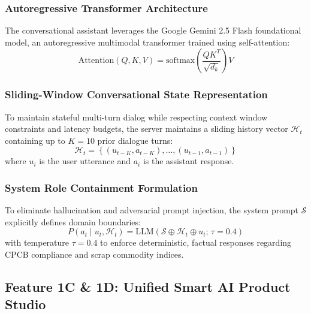 \documentclass[12pt,a4paper]{article}
\begin{document}
\subsubsection{Autoregressive Transformer Architecture}
The conversational assistant leverages the Google Gemini 2.5 Flash foundational model, an autoregressive multimodal transformer trained using self-attention:
\begin{equation}
\text{Attention}(Q, K, V) = \text{softmax}\left(\frac{QK^T}{\sqrt{d_k}}\right)V
\end{equation}

\subsubsection{Sliding-Window Conversational State Representation}
To maintain stateful multi-turn dialog while respecting context window constraints and latency budgets, the server maintains a sliding history vector $\mathcal{H}_t$ containing up to $K = 10$ prior dialogue turns:
\begin{equation}
\mathcal{H}_t = \left\{ (u_{t-K}, a_{t-K}), \dots, (u_{t-1}, a_{t-1}) \right\}
\end{equation}
where $u_i$ is the user utterance and $a_i$ is the assistant response.

\subsubsection{System Role Containment Formulation}
To eliminate hallucination and adversarial prompt injection, the system prompt $\mathcal{S}$ explicitly defines domain boundaries:
\begin{equation}
P(a_t \mid u_t, \mathcal{H}_t) = \text{LLM}\left(\mathcal{S} \oplus \mathcal{H}_t \oplus u_t; \, \tau = 0.4\right)
\end{equation}
with temperature $\tau = 0.4$ to enforce deterministic, factual responses regarding CPCB compliance and scrap commodity indices.

\subsection{Feature 1C \& 1D: Unified Smart AI Product Studio}
\end{document}
